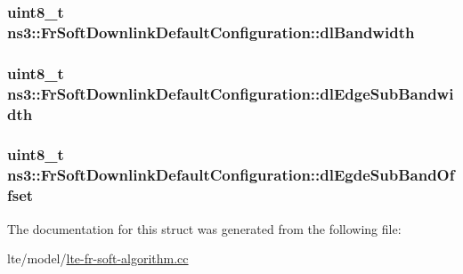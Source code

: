 \subsubsection[{\texorpdfstring{dl\+Bandwidth}{dlBandwidth}}]{\setlength{\rightskip}{0pt plus 5cm}uint8\+\_\+t ns3\+::\+Fr\+Soft\+Downlink\+Default\+Configuration\+::dl\+Bandwidth}\hypertarget{structns3_1_1FrSoftDownlinkDefaultConfiguration_ab5ccbe7db849400f48e884ca67b53bae}{}\label{structns3_1_1FrSoftDownlinkDefaultConfiguration_ab5ccbe7db849400f48e884ca67b53bae}
\subsubsection[{\texorpdfstring{dl\+Edge\+Sub\+Bandwidth}{dlEdgeSubBandwidth}}]{\setlength{\rightskip}{0pt plus 5cm}uint8\+\_\+t ns3\+::\+Fr\+Soft\+Downlink\+Default\+Configuration\+::dl\+Edge\+Sub\+Bandwidth}\hypertarget{structns3_1_1FrSoftDownlinkDefaultConfiguration_a9d17002d8b64cd841a9d225d56188987}{}\label{structns3_1_1FrSoftDownlinkDefaultConfiguration_a9d17002d8b64cd841a9d225d56188987}
\subsubsection[{\texorpdfstring{dl\+Egde\+Sub\+Band\+Offset}{dlEgdeSubBandOffset}}]{\setlength{\rightskip}{0pt plus 5cm}uint8\+\_\+t ns3\+::\+Fr\+Soft\+Downlink\+Default\+Configuration\+::dl\+Egde\+Sub\+Band\+Offset}\hypertarget{structns3_1_1FrSoftDownlinkDefaultConfiguration_a39a12b071ac232cead3f3596baad2b02}{}\label{structns3_1_1FrSoftDownlinkDefaultConfiguration_a39a12b071ac232cead3f3596baad2b02}


The documentation for this struct was generated from the following file\+:\begin{DoxyCompactItemize}
\item 
lte/model/\hyperlink{lte-fr-soft-algorithm_8cc}{lte-\/fr-\/soft-\/algorithm.\+cc}\end{DoxyCompactItemize}
